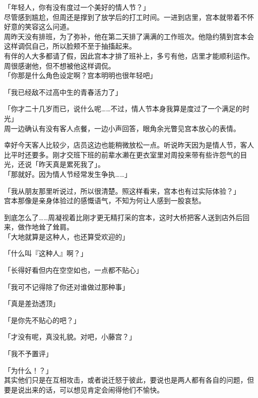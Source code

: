 「年轻人，你有没有度过一个美好的情人节？」\\

尽管感到尴尬，但周还是撑到了放学后的打工时间。一进到店里，宫本就带着不怀好意的笑容这么问道。\\

周昨天没有排班，为了弥补，他在第二天排了满满的工作班次。他隐约猜到宫本会这样调侃自己，所以脸颊不至于抽搐起来。\\

有伴的人大多都请了假，因此宫本才排了班补上，多亏有他，店里才能顺利运作。周很感谢他，但不想被他这样调侃。\\

「你那是什么角色设定啊？宫本明明也很年轻吧」

「我已经敌不过高中生的青春活力了」

「你才二十几岁而已，说什么呢……不过，情人节本身我算是度过了一个满足的时光」\\

周一边确认有没有客人点餐，一边小声回答，眼角余光瞥见宫本放心的表情。

幸好今天客人比较少，店员这边也能稍微放松一点。听说昨天因为是情人节，客人比平时还要多。刚才交班下班的前辈水濑在更衣室里对周投来带有些许怨气的目光，还说「昨天真是累死我了」。\\

「那就好。因为情人节经常发生争执……」

「我从朋友那里听说过，所以很清楚。照这样看来，宫本也有过实际体验？」\\

宫本那像是亲身体验过的感慨语气，不知为何让人感到一股哀愁。

到底怎么了……周凝视着比刚才更无精打采的宫本，这时大桥把客人送到店外后回来，做作地耸了耸肩。\\

「大地就算是这种人，也还算受欢迎的」

「什么叫『这种人』啊？」

「长得好看但内在空空如也，一点都不贴心」

「我可不记得除了你还对谁做过那种事」

「真是差劲透顶」

「是你先不贴心的吧？」

「才没有呢，真没礼貌。对吧，小藤宫？」

「我不予置评」

「为什么！？」\\

其实他们只是在互相攻击，或者说迁怒于彼此，要说也是两人都有各自的问题，但要是说出来的话，可以想见肯定会闹得他们不愉快。\\

